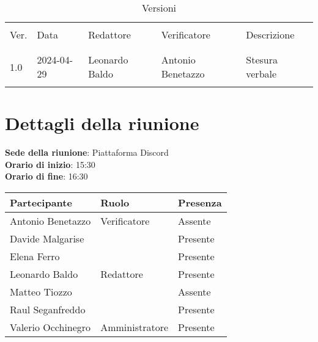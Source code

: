 \documentclass[italian,12pt]{article}
\begin{document}


\newpage



\begin{table}[!h]
	\caption{Versioni}
	\footnotesize
	\begin{center}
		\begin{tabular}{ l l l l l }
			\hline \\[-2ex]
			Ver. & Data       & Redattore      & Verificatore      & Descrizione     \\
			\\[-2ex] \hline \\[-1.5ex]
			1.0  & 2024-04-29 & Leonardo Baldo & Antonio Benetazzo & Stesura verbale \\
			\\[-1.5ex] \hline
		\end{tabular}
	\end{center}
\end{table}

\newpage

\tableofcontents

\newpage

\section{Dettagli della riunione}


\textbf{Sede della riunione}: Piattaforma Discord\\
\textbf{Orario di inizio}: 15:30\\
\textbf{Orario di fine}: 16:30\\


\begin{flushleft}
	\begin{table}[!h]
	\begin{tabular}{ |l|l|l| } 
		\hline
		\textbf{Partecipante} & \textbf{Ruolo}       & \textbf{Presenza} \\
		\hline 
		Antonio Benetazzo     & Verificatore         & Assente           \\
		Davide Malgarise      &                      & Presente          \\
		Elena Ferro           &                      & Presente          \\
		Leonardo Baldo        & Redattore            & Presente          \\
		Matteo Tiozzo         &                      & Assente           \\
		Raul Seganfreddo      &                      & Presente          \\
		Valerio Occhinegro    & Amministratore       & Presente          \\
		\hline
	\end{tabular}
	\end{table}
\end{flushleft}
\end{document}
